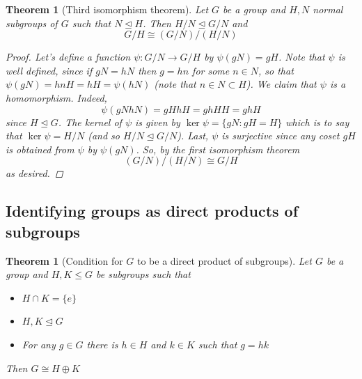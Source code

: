 \documentclass[12pt]{article}
\numberwithin{equation}{subsection}
\newtheorem{thm}[subsection]{Theorem}
\theoremstyle{note}
\newcommand{\nrml}{\trianglelefteq}
\begin{document}
\begin{thm}[Third isomorphism theorem]
Let $G$ be a group and $H,N$ normal subgroups of $G$ such that $N\nrml H$. Then $H/N \nrml G/N$ and \begin{equation} G/H \cong (G/N) / (H/N)\end{equation}

\begin{proof} 
	Let's define a function $\psi\colon G/N\to G/H$ by $\psi(gN)=gH$. Note that $\psi$ is well defined, since if $gN=hN$ then $g=hn$ for some $n\in N$, so that $\psi(gN)=hnH=hH=\psi(hN)$ (note that $n\in N\subset H$). We claim that $\psi$ is a homomorphism. Indeed, \[\psi(gN hN)=gHhH=ghHH=ghH\] since $H\nrml G$. The kernel of $\psi$ is given by $\ker\psi=\{gN : gH=H\}$ which is to say that $\ker\psi=H/N$ (and so $H/N\nrml G/N$). Last, $\psi$ is surjective since any coset $gH$ is obtained from $\psi$ by $\psi(gN)$. So, by the first isomorphism theorem \[ (G/N) / (H/N) \cong G/H\] as desired.
\end{proof}
\end{thm}





\subsection{Identifying groups as direct products of subgroups}

\begin{thm}[Condition for $G$ to be a direct product of subgroups] \label{product-subgroup}
	Let $G$ be a group and $H,K\leq G$ be subgroups such that \begin{itemize}
		\item $H\cap K=\{e\}$
		\item $H,K\nrml G$
		\item For any $g\in G$ there is $h\in H$ and $k\in K$ such that $g=hk$
	\end{itemize}
	Then $G\cong H\oplus K$
\end{thm}
\end{document}
